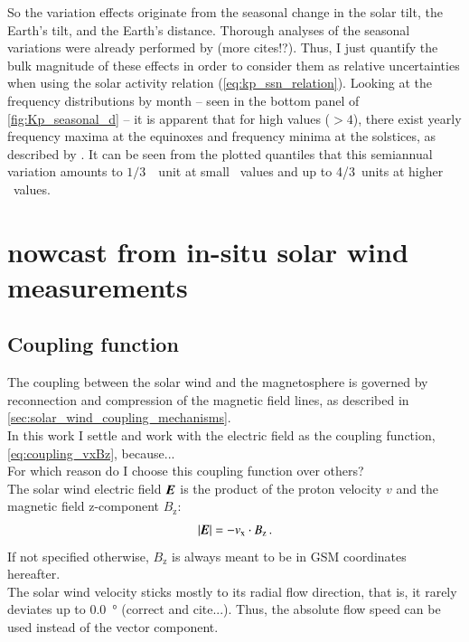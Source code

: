 So the \Kp{} variation effects originate from the seasonal change in the solar tilt, the Earth's tilt, and the Earth's distance. Thorough analyses of the seasonal variations were already performed by \citep{Cortie1912} (more cites!?). Thus, I just quantify the bulk magnitude of these effects in order to consider them as relative uncertainties when using the solar activity relation (\ref{eq:kp_ssn_relation}). Looking at the \Kp{} frequency distributions by month -- seen in the bottom panel of \autoref{fig:Kp_seasonal_d} -- it is apparent that for high \Kp{} values ($>4$), there exist yearly frequency maxima at the equinoxes and frequency minima at the solstices, as described by \citep{Cortie1912}. It can be seen from the plotted quantiles that this semiannual variation amounts to $1/3$~\Kp~unit at small \Kp~values and up to 4/3~units at higher \Kp~values.


\section{\Kp{} nowcast from in-situ solar wind measurements}
\label{sec:kp_nowcast}

\subsection{Coupling function}

The coupling between the solar wind and the magnetosphere is governed by reconnection and compression of the magnetic field lines, as described in \autoref{sec:solar_wind_coupling_mechanisms}.\\

In this work I settle and work with the electric field as the coupling function, \autoref{eq:coupling_vxBz}, because...\\
For which reason do I choose this coupling function over others?\\

The solar wind electric field $\boldsymbol{E}$ is the product of the proton velocity $v$ and the magnetic field z-component $B_\text{z}$:
\begin{align}
	|\boldsymbol{E}| = -v_\text{x} \cdot B_\text{z}\,.
\end{align}
If not specified otherwise, $B_\text{z}$ is always meant to be in GSM coordinates hereafter.\\


The solar wind velocity sticks mostly to its radial flow direction, that is, it rarely deviates up to \SI{0.0}{\degree} (correct and cite...). Thus, the absolute flow speed can be used instead of the vector component.\\

